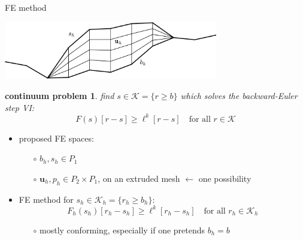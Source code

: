 \documentclass[10pt,svgnames]{beamer}
\newtheorem*{cproblem}{continuum problem}
\newcommand{\bu}{\mathbf{u}}
\newcommand{\cK}{\mathcal{K}}
\begin{document}
\begin{frame}{FE method}

\begin{center}
\includegraphics[width=0.7\textwidth]{extruded}
\end{center}

\begin{cproblem}
find $s\in\cK = \{r \ge b\}$ which solves the backward-Euler step VI:
   $$F(s)[r-s] \ge \ell^k[r-s] \quad \text{for all } r \in \cK$$
\end{cproblem}

\begin{itemize}
\item proposed FE spaces:
   \begin{itemize}
   \item[$\circ$] $b_h,s_h \in P_1$
   \item[$\circ$] $\bu_h,p_h \in P_2 \times P_1$, on an extruded mesh \hfill {\scriptsize $\leftarrow$ one possibility}
   \end{itemize}
\item FE method for $s_h\in\cK_h = \{r_h \ge b_h\}$:
   $$F_h(s_h)[r_h-s_h] \ge \ell^k[r_h-s_h] \quad \text{for all } r_h \in \cK_h$$

   \begin{itemize}
   \item[$\circ$] mostly conforming, especially if one pretends $b_h=b$
   \end{itemize}
\end{itemize}

\phantom{x}
\end{frame}
\end{document}
